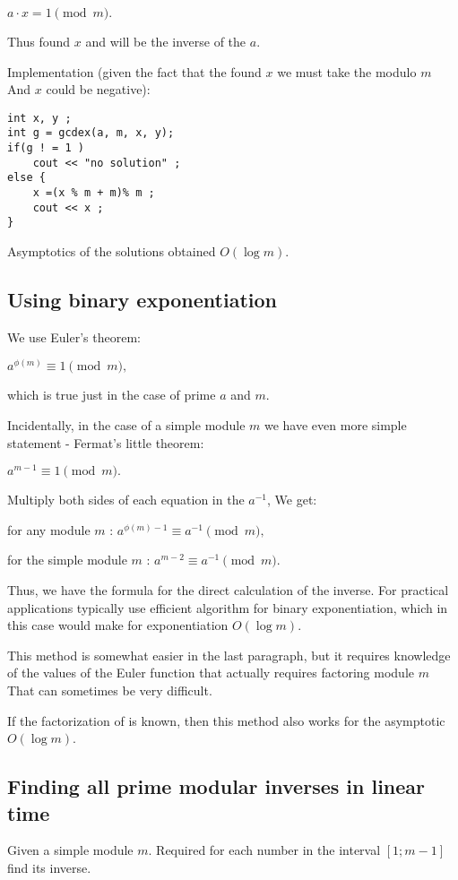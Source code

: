 $a \cdot x = 1 \pmod m.$

Thus found $x$ and will be the inverse of the $a$.

Implementation (given the fact that the found $x$ we must take the modulo $m$ And $x$ could be negative):

\begin{verbatim}
int x, y ;
int g = gcdex(a, m, x, y);
if(g ! = 1 )
    cout << "no solution" ;
else {
    x =(x % m + m)% m ;
    cout << x ;
} 
\end{verbatim}
Asymptotics of the solutions obtained $O (\log m)$.

\subsection{ Using binary exponentiation }

We use Euler's theorem:

$a ^ {\phi (m)} \equiv 1 \pmod m,$

which is true just in the case of prime $a$ and $m$.

Incidentally, in the case of a simple module $m$ we have even more simple statement - Fermat's little theorem:

$a ^ {m-1} \equiv 1 \pmod m.$

Multiply both sides of each equation in the $a ^ {-1}$, We get:

for any module $m$ :
$a ^ {\phi (m) -1} \equiv a ^ {-1} \pmod m,$

for the simple module $m$ :
$a ^ {m-2} \equiv a ^ {-1} \pmod m.$

Thus, we have the formula for the direct calculation of the inverse. For practical applications typically use efficient algorithm for binary exponentiation, which in this case would make for exponentiation $O (\log m)$.

This method is somewhat easier in the last paragraph, but it requires knowledge of the values ​​of the Euler function that actually requires factoring module $m$ That can sometimes be very difficult.

If the factorization of is known, then this method also works for the asymptotic $O (\log m)$.

\subsection{ Finding all prime modular inverses in linear time }

Given a simple module $m$. Required for each number in the interval $[1; m-1]$ find its inverse.

